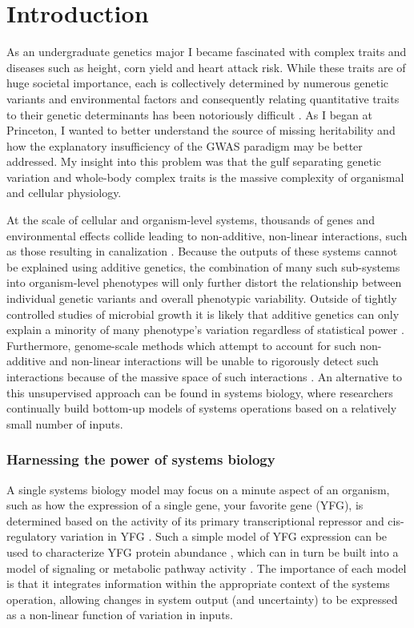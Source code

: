 
\chapter{Introduction\label{ch:intro}}

As an undergraduate genetics major I became fascinated with complex traits and diseases such as height, corn yield and heart attack risk. While these traits are of huge societal importance, each is collectively determined by numerous genetic variants and environmental factors and consequently relating quantitative traits to their genetic determinants has been notoriously difficult \cite{Manolio:2009jp}. As I began at Princeton, I wanted to better understand the source of missing heritability and how the explanatory insufficiency of the GWAS paradigm may be better addressed. My insight into this problem was that the gulf separating genetic variation and whole-body complex traits is the massive complexity of organismal and cellular physiology.

At the scale of cellular and organism-level systems, thousands of genes and environmental effects collide leading to non-additive, non-linear interactions, such as those resulting in canalization \cite{Waddington:1942wy}. Because the outputs of these systems cannot be explained using additive genetics, the combination of many such sub-systems into organism-level phenotypes will only further distort the relationship between individual genetic variants and overall phenotypic variability. Outside of tightly controlled studies of microbial growth \cite{Bloom:2013bq} it is likely that additive genetics can only explain a minority of many phenotype's variation regardless of statistical power \cite{Weedon:2008gc,WellcomeTrustCaseControlConsortium:2007do}. Furthermore, genome-scale methods which attempt to account for such non-additive and non-linear interactions will be unable to rigorously detect such interactions because of the massive space of such interactions \cite{Friedman:1997kn}. An alternative to this unsupervised approach can be found in systems biology, where researchers continually build bottom-up models of systems operations based on a relatively small number of inputs.

\subsection{Harnessing the power of systems biology}

A single systems biology model may focus on a minute aspect of an organism, such as how the expression of a single gene, your favorite gene (YFG), is determined based on the activity of its primary transcriptional repressor and cis-regulatory variation in YFG \cite{Nuzhdin:2012ii}. Such a simple model of YFG expression can be used to characterize YFG protein abundance \cite{Jovanovic:2015hp}, which can in turn be built into a model of signaling or metabolic pathway activity \cite{Neves:2002bk, Chassagnole:2002ty}.  The importance of each model is that it integrates information within the appropriate context of the systems operation, allowing changes in system output (and uncertainty) to be expressed as a non-linear function of variation in inputs.

